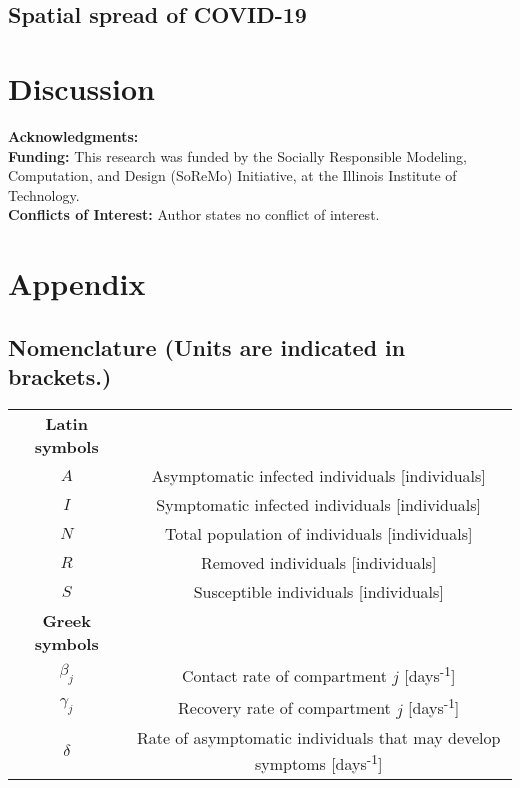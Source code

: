 \documentclass[11pt]{article}
\begin{document}
	\subsection{Spatial spread of COVID-19}

\section{Discussion}
	
	\textbf{Acknowledgments:} \\
	\textbf{Funding:}
	This research was funded by the Socially Responsible Modeling, Computation, and Design (SoReMo) Initiative, at the Illinois Institute of Technology. \\
	\textbf{Conflicts of Interest:}
	Author states no conflict of interest. \\
	
\section*{Appendix}
	\subsection*{Nomenclature (Units are indicated in brackets.)}
		\begin{table}[h!]
			\begin{tabular}{c c}
				\textbf{Latin symbols} & \\
				$A$ & Asymptomatic infected individuals [individuals] \\
				$I$ & Symptomatic infected individuals [individuals] \\
				$N$ & Total population of individuals [individuals] \\
				$R$ & Removed individuals [individuals] \\
				$S$ & Susceptible individuals [individuals] \\
				\textbf{Greek symbols} & \\
				$\beta_j$ & Contact rate of compartment $j$ [days\textsuperscript{-1}] \\
				$\gamma_j$ & Recovery rate of compartment $j$ [days\textsuperscript{-1}] \\
				$\delta$ & Rate of asymptomatic individuals that may develop symptoms [days\textsuperscript{-1}]
			\end{tabular}
		\end{table}



\end{document}
